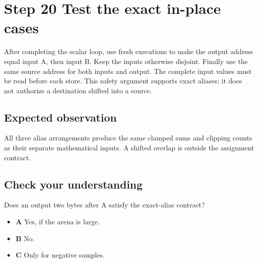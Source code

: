 \section{Step 20 Test the exact in-place cases}\label{pcm-s20}

After completing the scalar loop, use fresh executions to make the output address equal input A, then input B. Keep the inputs otherwise disjoint. Finally use the same source address for both inputs and output. The complete input values must be read before each store. This safety argument supports exact aliases; it does not authorize a destination shifted into a source.

\subsection{Expected observation}
All three alias arrangements produce the same clamped sums and clipping counts as their separate mathematical inputs. A shifted overlap is outside the assignment contract.

\subsection{Check your understanding}
Does an output two bytes after A satisfy the exact-alias contract?

\begin{itemize}
\item \textbf{A} Yes, if the arena is large.
\item \textbf{B} No.
\item \textbf{C} Only for negative samples.
\end{itemize}
